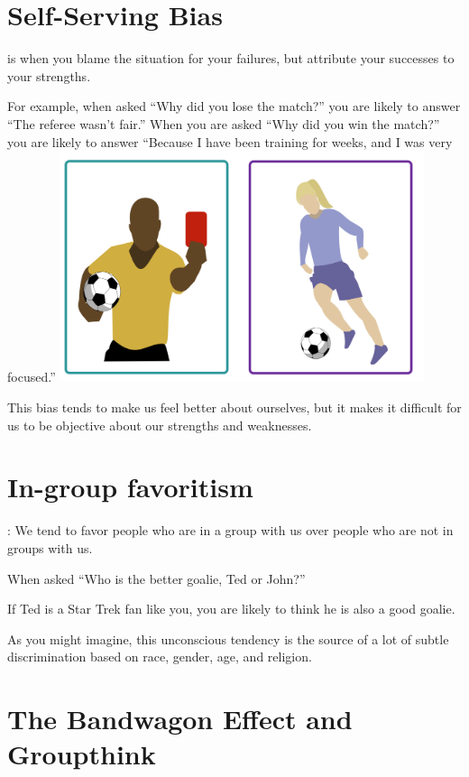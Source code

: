 \section{Self-Serving Bias}

 is when you blame the situation for your
failures, but attribute your successes to your strengths.

For example, when asked ``Why did you lose the match?'' you are likely
to answer ``The referee wasn't fair.''  When you are asked ``Why did
you win the match?'' you are likely to answer ``Because I have been
training for weeks, and I was very focused.''
\includegraphics[width=0.8\textwidth]{bias_soccer.png}

This bias tends to make us feel better about ourselves, but it makes it
difficult for us to be objective about our strengths and weaknesses.

\section{In-group favoritism}

: We tend to favor people who are in
a group with us over people who are not in groups with us.

When asked ``Who is the better goalie, Ted or John?''

If Ted is a Star Trek fan like you, you are likely to think he is also
a good goalie.

As you might imagine, this unconscious tendency is the source of a lot
of subtle discrimination based on race, gender, age, and religion.

\section{The Bandwagon Effect and Groupthink}


